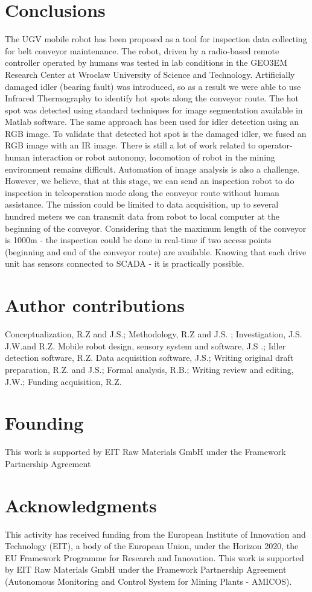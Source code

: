 \documentclass[3p,times,12pt]{elsarticle}
\begin{document}
\section{Conclusions}
The UGV mobile robot has been proposed as a tool for inspection data collecting for belt conveyor maintenance. The robot, driven by a radio-based remote controller operated by humans was tested in lab conditions in the GEO3EM Research Center at Wroclaw University of Science and Technology. Artificially damaged idler (bearing fault) was introduced, so as a result we were able to use Infrared Thermography to identify hot spots along the conveyor route. The hot spot was detected using standard techniques for image segmentation available in Matlab software. The same approach has been used for idler detection using an RGB image. To validate that detected hot spot is the damaged idler, we fused an RGB image with an IR image. 
There is still a lot of work related to operator-human interaction or robot autonomy, locomotion of robot in the mining environment remains difficult. Automation of image analysis is also a challenge. However, we believe, that at this stage, we can send an inspection robot to do inspection in teleoperation mode along the conveyor route without human assistance. The mission could be limited to data acquisition, up to several hundred meters we can transmit data from robot to local computer at the beginning of the conveyor. Considering that the maximum length of the conveyor is 1000m - the inspection could be done in real-time if two access points (beginning and end of the conveyor route) are available. Knowing that each drive unit has sensors connected to SCADA - it is practically possible.

\section*{Author contributions}
Conceptualization, R.Z and J.S.; Methodology, R.Z and J.S. ; Investigation, J.S. J.W.and R.Z.
Mobile robot design, sensory system and software, J.S .; Idler detection software, R.Z.
Data acquisition software, J.S.; Writing original draft preparation, R.Z. and J.S.;
Formal analysis, R.B.; Writing review and editing, J.W.; Funding acquisition, R.Z. 
\section*{Founding}
This work is supported by EIT Raw Materials GmbH under the Framework Partnership Agreement
\section*{Acknowledgments}
This activity has received funding from the European Institute of Innovation and Technology (EIT), a body of the European Union, under the Horizon 2020, the EU Framework Programme for Research and Innovation. This work is supported by EIT Raw Materials GmbH under the Framework Partnership Agreement  (Autonomous Monitoring and Control System for Mining Plants - AMICOS).
\end{document}

